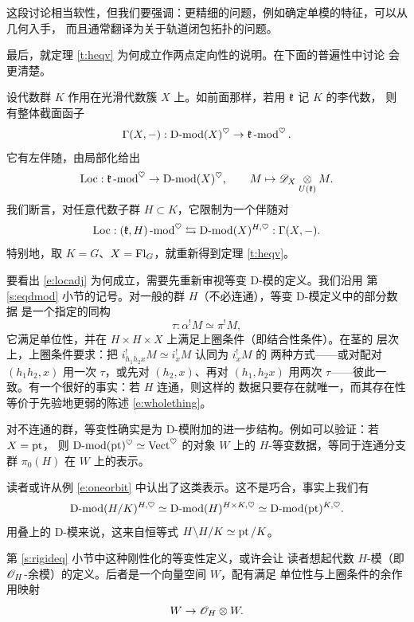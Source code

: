 这段讨论相当软性，但我们要强调：更精细的问题，例如确定单模的特征，可以从几何入手，
而且通常翻译为关于轨道闭包拓扑的问题。

\ssszh 最后，就定理 \ref{t:heqv} 为何成立作两点定向性的说明。在下面的普遍性中讨论
会更清楚。\label{s:kandx}

设代数群 $K$ 作用在光滑代数簇 $X$ 上。如前面那样，若用 $\mathfrak{k}$ 记 $K$ 的李代数，
则有整体截面函子
%
\[
   \Gamma(X, -): \operatorname{D-mod}(X)^\heartsuit \rightarrow \mathfrak{k}\operatorname{-mod}^\heartsuit.
\]
%
它有左伴随，由局部化给出
%
\[
   \operatorname{Loc}: \mathfrak{k}\operatorname{-mod}^\heartsuit \rightarrow \operatorname{D-mod}(X)^\heartsuit, \quad
   \quad M \mapsto \mathscr{D}_X \underset{U(\mathfrak{k}) } \otimes M.
\]
%
我们断言，对任意代数子群 $H \subset K$，它限制为一个伴随对
%
\begin{equation} \label{e:locadj}
  \operatorname{Loc}:(\mathfrak{k}, H)\operatorname{-mod}^\heartsuit \leftrightarrows
  \operatorname{D-mod}(X)^{H, \heartsuit}: \Gamma(X, -).
\end{equation}
%
特别地，取 $K = G$、$X = \operatorname{Fl}_G$，就重新得到定理 \ref{t:heqv}。

\ssszh 要看出 \eqref{e:locadj} 为何成立，需要先重新审视等变 D-模的定义。我们沿用
第 \ref{s:eqdmod} 小节的记号。对一般的群 $H$（不必连通），等变 D-模定义中的部分数据
是一个指定的同构
%
\[
\tau:  \alpha^! M \simeq \pi^! M,
\]
%
它满足单位性，并在 $H \times H \times X$ 上满足上圈条件（即结合性条件）。在茎的
层次上，上圈条件要求：把 $i^!_{h_1 h_2 x} M \simeq i_x^! M$ 认同为 $i_x^! M$ 的
两种方式——或对配对 $(h_1h_2, x)$ 用一次 $\tau$，或先对 $(h_2, x)$、再对
$(h_1, h_2x)$ 用两次 $\tau$——彼此一致。有一个很好的事实：若 $H$ 连通，则这样的
数据只要存在就唯一，而其存在性等价于先验地更弱的陈述 \eqref{e:wholething}。

\begin{re}
对不连通的群，等变性确实是为 D-模附加的进一步结构。例如可以验证：若 $X = \operatorname{pt}$，
则 $\operatorname{D-mod}(\operatorname{pt})^\heartsuit \simeq \operatorname{Vect}^\heartsuit$ 的对象 $W$ 上的
$H$-等变数据，等同于连通分支群 $\pi_0(H)$ 在 $W$ 上的表示。

读者或许从例 \ref{e:oneorbit} 中认出了这类表示。这不是巧合，事实上我们有
%
\[ \operatorname{D-mod}(H/K)^{H, \heartsuit} \simeq \operatorname{D-mod}(H)^{H \times K, \heartsuit}
\simeq \operatorname{D-mod}(\operatorname{pt})^{K, \heartsuit}.  \]
%
用叠上的 D-模来说，这来自恒等式 $H \backslash H/K \simeq \operatorname{pt}/K$。
\end{re}

\label{s:rigideq}

\ssszh \label{s:rigimon}第 \ref{s:rigideq} 小节中这种刚性化的等变性定义，或许会让
读者想起代数 $H$-模（即 $\mathscr{O}_H$-余模）的定义。后者是一个向量空间 $W$，配有满足
单位性与上圈条件的余作用映射
%
\[
   W \rightarrow \mathscr{O}_H \otimes W.
\]
%


